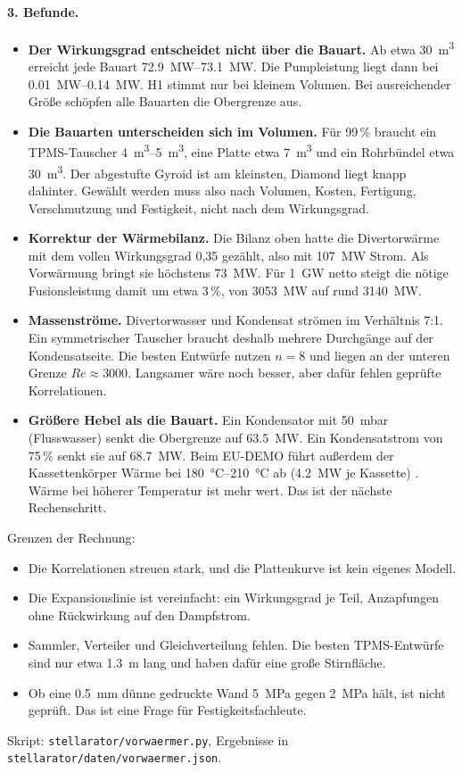 \documentclass[10pt,a4paper]{article}
\begin{document}
\paragraph{3. Befunde.}
\begin{itemize}
\item \textbf{Der Wirkungsgrad entscheidet nicht über die Bauart.} Ab etwa \SI{30}{m^3} erreicht jede Bauart
  \SIrange{72,9}{73,1}{MW}. Die Pumpleistung liegt dann bei \SIrange{0,01}{0,14}{MW}. H1 stimmt nur bei kleinem
  Volumen. Bei ausreichender Größe schöpfen alle Bauarten die Obergrenze aus.
\item \textbf{Die Bauarten unterscheiden sich im Volumen.} Für 99\,\% braucht ein TPMS-Tauscher
  \SIrange{4}{5}{m^3}, eine Platte etwa \SI{7}{m^3} und ein Rohrbündel etwa \SI{30}{m^3}. Der abgestufte Gyroid
  ist am kleinsten, Diamond liegt knapp dahinter. Gewählt werden muss also nach Volumen, Kosten, Fertigung,
  Verschmutzung und Festigkeit, nicht nach dem Wirkungsgrad.
\item \textbf{Korrektur der Wärmebilanz.} Die Bilanz oben hatte die Divertorwärme mit dem vollen Wirkungsgrad
  0,35 gezählt, also mit \SI{107}{MW} Strom. Als Vorwärmung bringt sie höchstens \SI{73}{MW}. Für \SI{1}{GW} netto
  steigt die nötige Fusionsleistung damit um etwa 3\,\%, von \SI{3053}{MW} auf rund \SI{3140}{MW}.
\item \textbf{Massenströme.} Divertorwasser und Kondensat strömen im Verhältnis 7:1. Ein symmetrischer Tauscher
  braucht deshalb mehrere Durchgänge auf der Kondensatseite. Die besten Entwürfe nutzen $n = 8$ und liegen an der
  unteren Grenze $\mathit{Re} \approx 3000$. Langsamer wäre noch besser, aber dafür fehlen geprüfte
  Korrelationen.
\item \textbf{Größere Hebel als die Bauart.} Ein Kondensator mit \SI{50}{mbar} (Flusswasser) senkt die
  Obergrenze auf \SI{63,5}{MW}. Ein Kondensatstrom von 75\,\% senkt sie auf \SI{68,7}{MW}. Beim EU-DEMO führt
  außerdem der Kassettenkörper Wärme bei \SIrange{180}{210}{\celsius} ab (\SI{4,2}{MW} je Kassette)
  \cite{you2022}. Wärme bei höherer Temperatur ist mehr wert. Das ist der nächste Rechenschritt.
\end{itemize}
Grenzen der Rechnung:
\begin{itemize}
\item Die Korrelationen streuen stark, und die Plattenkurve ist kein eigenes Modell.
\item Die Expansionslinie ist vereinfacht: ein Wirkungsgrad je Teil, Anzapfungen ohne Rückwirkung auf den
  Dampfstrom.
\item Sammler, Verteiler und Gleichverteilung fehlen. Die besten TPMS-Entwürfe sind nur etwa \SI{1,3}{m} lang
  und haben dafür eine große Stirnfläche.
\item Ob eine \SI{0,5}{mm} dünne gedruckte Wand \SI{5}{MPa} gegen \SI{2}{MPa} hält, ist nicht geprüft. Das ist eine
  Frage für Festigkeitsfachleute.
\end{itemize}
Skript: \texttt{stellarator/vorwaermer.py}, Ergebnisse in \texttt{stellarator/daten/vorwaermer.json}.
\end{document}
